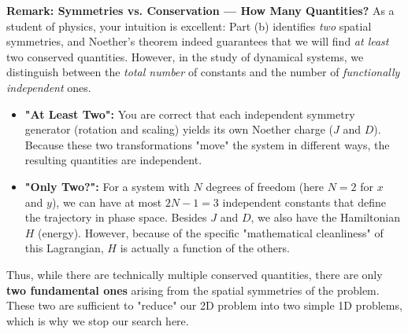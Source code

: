 \begin{solution}
\textbf{Remark: Symmetries vs. Conservation --- How Many Quantities?}
As a student of physics, your intuition is excellent: Part (b) identifies \textit{two} spatial symmetries, and Noether's theorem indeed guarantees that we will find \textit{at least} two conserved quantities. However, in the study of dynamical systems, we distinguish between the \textit{total number} of constants and the number of \textit{functionally independent} ones.
\begin{itemize}
    \item \textbf{"At Least Two":} You are correct that each independent symmetry generator (rotation and scaling) yields its own Noether charge ($J$ and $D$). Because these two transformations "move" the system in different ways, the resulting quantities are independent.
    \item \textbf{"Only Two?":} For a system with $N$ degrees of freedom (here $N=2$ for $x$ and $y$), we can have at most $2N-1 = 3$ independent constants that define the trajectory in phase space. Besides $J$ and $D$, we also have the Hamiltonian $H$ (energy). However, because of the specific "mathematical cleanliness" of this Lagrangian, $H$ is actually a function of the others.
\end{itemize}
Thus, while there are technically multiple conserved quantities, there are only \textbf{two fundamental ones} arising from the spatial symmetries of the problem. These two are sufficient to "reduce" our 2D problem into two simple 1D problems, which is why we stop our search here.


\end{solution}
